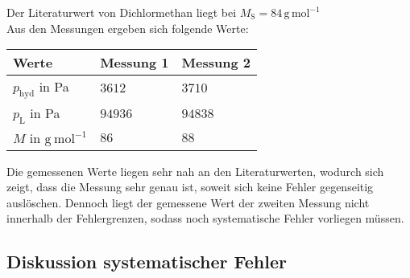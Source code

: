 \documentclass[12pt,a4paper,titlepage,headinclude,bibtotoc]{scrartcl}
\begin{document}
Der Literaturwert von Dichlormethan liegt bei 
$M_\mathrm{S} = 84\, \mathrm{g\,mol^{-1}}$
\\


Aus den Messungen ergeben sich folgende Werte:\\


\begin{table} [h]
\centering
\begin{tabular}{|p{4 cm}||p{4 cm}|p{4 cm}|}
        \hline
		Werte & Messung 1 & Messung 2\\
         \hline 
        $ p_\mathrm{hyd}$ in Pa & $3612$  & $3710$ \\
        \hline
        $ p_\mathrm{L}   $ in Pa & $94936$  & $94838$ \\
        \hline
        $ M $ in $\mathrm{g{~}mol^{-1}}$ & $86$ & $88$ \\
        \hline     
\end{tabular}
\end{table}

Die gemessenen Werte liegen sehr nah an den Literaturwerten, wodurch sich zeigt, dass die Messung sehr genau ist, soweit sich keine Fehler gegenseitig auslöschen. Dennoch liegt der gemessene Wert der zweiten Messung nicht innerhalb der Fehlergrenzen, sodass noch systematische Fehler vorliegen müssen.

\subsection{Diskussion systematischer Fehler}
\end{document}
